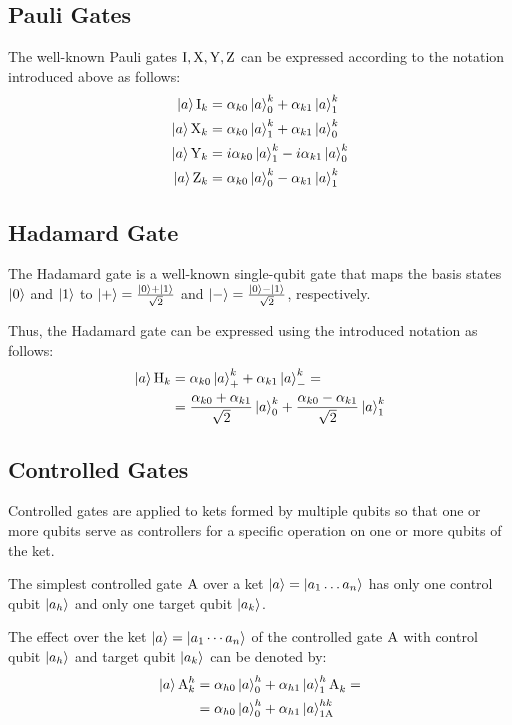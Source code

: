\documentclass[sigconf,natbib=false]{acmart}
\begin{document}
	\subsection{Pauli Gates}
	The well-known Pauli gates $\text{I}, \text{X}, \text{Y}, \text{Z}$ can be expressed according to the  notation  introduced above as follows:
	\begin{align}
		\ket{a}\text{I}_k &= \alpha_{k0}\ket{a}^{k}_{0}+\alpha_{k1}\ket{a}^{k}_{1} \\
		\ket{a}\text{X}_k &= \alpha_{k0}\ket{a}^{k}_{1}+\alpha_{k1}\ket{a}^{k}_{0}\\
		\ket{a}\text{Y}_k &= i \alpha_{k0}\ket{a}^{k}_{1}-i \alpha_{k1}\ket{a}^{k}_{0}\\
		\ket{a}\text{Z}_k &= \alpha_{k0}\ket{a}^{k}_{0}-\alpha_{k1}\ket{a}^{k}_{1}
	\end{align}

	\subsection{Hadamard Gate}
	The Hadamard gate is a well-known single-qubit gate that maps the basis states $\ket{0}$ and $\ket{1}$  to $\ket{+}=\frac{\ket{0}+\ket{1}}{\sqrt{2}}$ and $\ket{-}=\frac{\ket{0}-\ket{1}}{\sqrt{2}}$, respectively.

	Thus, the Hadamard gate can be expressed using the introduced notation as follows:
	\begin{align}
		\label{eq:hadamard}
		\ket{a}\text{H}_k&=\alpha_{k0}\ket{a}^{k}_{+}+\alpha_{k1}\ket{a}^{k}_{-}=\\
		&=
		\frac{\alpha_{k0}+\alpha_{k1}}{\sqrt{2}}\ket{a}^{k}_{0}+\frac{\alpha_{k0}-\alpha_{k1}}{\sqrt{2}}\ket{a}^{k}_{1}
	\end{align}

	\subsection{Controlled Gates}
	Controlled gates are applied to kets formed by multiple qubits so that one or more qubits serve as controllers for a specific operation on one or more qubits of the ket.

	The simplest controlled gate $\text{A}$ over a ket $\ket{a}=\ket{a_1\dots a_n}$ has only one control qubit $\ket{a_h}$ and only one target qubit $\ket{a_k}$.

	\begin{notation}
		The effect over the  ket $\ket{a}=\ket{a_1\cdots a_n}$ of the controlled gate $\text{A}$ with control qubit $\ket{a_h}$ and  target qubit $\ket{a_k}$ can be denoted by:
		\begin{align}
			\label{eq:generic-controlled-gate}
			\ket{a}\text{A}^{h}_{k}&=\alpha_{h0}\ket{a}^{h}_{0}+\alpha_{h1} \ket{a}^{h}_{1}\text{A}^{}_{k}= \\
			&=\alpha_{h0}\ket{a}^{h}_{0}+\alpha_{h1} \ket{a}^{hk}_{1\text{A}}
		\end{align}
	\end{notation}
\end{document}
